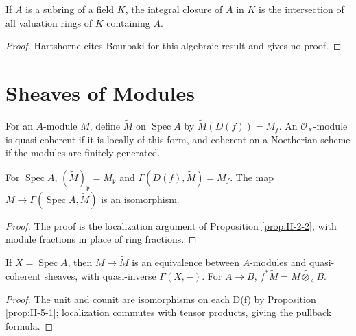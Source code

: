 \begin{theorem}
\label{thm:II-4-11A}
If $A$ is a subring of a field $K$, the integral closure of $A$ in $K$ is the intersection of all
valuation rings of $K$ containing $A$.
\end{theorem}
\begin{proof}
Hartshorne cites Bourbaki for this algebraic result and gives no proof.
\end{proof}

\section{Sheaves of Modules}

\begin{definition}
\label{def:II-5-module-sheaf}
For an $A$-module $M$, define $\widetilde M$ on $\operatorname{Spec}A$ by
$\widetilde M(D(f))=M_f$. An $\mathcal O_X$-module is quasi-coherent if it is locally of this form, and
coherent on a Noetherian scheme if the modules are finitely generated.
\end{definition}

\begin{proposition}
\label{prop:II-5-1}
For $\operatorname{Spec}A$, $(\widetilde M)_\mathfrak p=M_\mathfrak p$ and
$\Gamma(D(f),\widetilde M)=M_f$. The map $M\to\Gamma(\operatorname{Spec}A,\widetilde M)$ is an isomorphism.
\end{proposition}
\begin{proof}
The proof is the localization argument of Proposition \ref{prop:II-2-2}, with module fractions in place
of ring fractions.
\end{proof}

\begin{proposition}
\label{prop:II-5-2}
If $X=\operatorname{Spec}A$, then $M\mapsto\widetilde M$ is an equivalence between $A$-modules and
quasi-coherent sheaves, with quasi-inverse $\Gamma(X,-)$. For $A\to B$,
$f^*\widetilde M=\widetilde{M\otimes_AB}$.
\end{proposition}
\begin{proof}
The unit and counit are isomorphisms on each D(f) by Proposition \ref{prop:II-5-1}; localization
commutes with tensor products, giving the pullback formula.
\end{proof}

